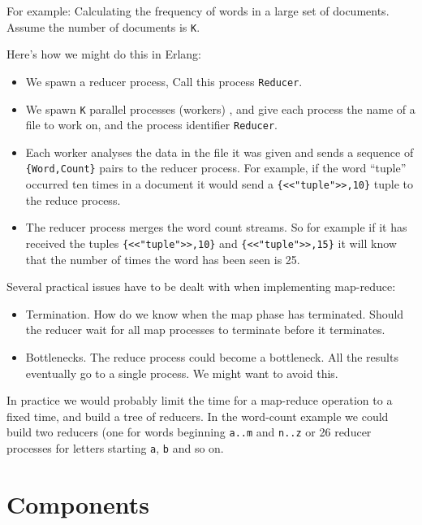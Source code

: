 \documentclass[10pt]{article}
\begin{document}
For example: Calculating the frequency of words in a large set of
documents.  Assume the number of documents is \verb+K+.

Here's how we might do this in Erlang:

\begin{itemize}
\item We spawn a reducer process, Call this process \verb+Reducer+.
\item We spawn \verb+K+ parallel processes (workers) , and give each
  process the name of a file to work on, and the process identifier
  \verb+Reducer+.

\item Each worker analyses the data in the file it was given and sends
  a sequence of \verb+{Word,Count}+ pairs to the reducer process.
  For example, if the word ``tuple'' occurred ten times in a
  document it would send a \verb+{<<"tuple">>,10}+ tuple to the
  reduce process.

\item The reducer process merges the word count streams. So for
  example if it has received the tuples \verb+{<<"tuple">>,10}+ and
  \verb+{<<"tuple">>,15}+ it will know that the number of times the
  word has been seen is 25.

\end{itemize}

Several practical issues have to be dealt with when implementing
map-reduce:

\begin{itemize}

\item Termination. How do we know when the map phase has terminated.
  Should the reducer wait for all map processes to terminate before
  it terminates.

\item Bottlenecks. The reduce process could become a bottleneck. All
  the results eventually go to a single process. We might want to
  avoid this.
\end{itemize}

In practice we would probably limit the time for a map-reduce
operation to a fixed time, and build a tree of reducers. In the
word-count example we could build two reducers (one for words
beginning \verb+a..m+ and \verb+n..z+ or 26 reducer processes for
letters starting \verb+a+, \verb+b+ and so on.

\section{Components}
\end{document}
